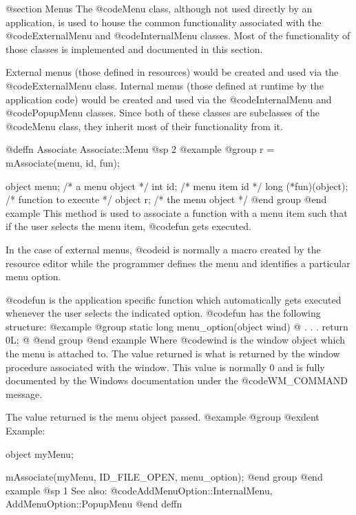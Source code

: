 @section Menus
The @code{Menu} class, although not used directly by an application, is
used to house the common functionality associated with the
@code{ExternalMenu} and @code{InternalMenu} classes.  Most of the
functionality of those classes is implemented and documented in this
section.

External menus (those defined in resources) would be created and used
via the @code{ExternalMenu} class.  Internal menus (those defined at runtime
by the application code) would be created and used via the
@code{InternalMenu} and @code{PopupMenu} classes.  Since both of these
classes are subclasses of the @code{Menu} class, they inherit most of
their functionality from it.







@deffn {Associate} Associate::Menu
@sp 2
@example
@group
r = mAssociate(menu, id, fun);

object  menu;   /*  a menu object     */
int     id;     /*  menu item id      */
long    (*fun)(object);  /*  function to execute  */
object  r;      /*  the menu object   */
@end group
@end example
This method is used to associate a function with a menu item such that if
the user selects the menu item, @code{fun} gets executed.

In the case of external menus, @code{id} is normally a macro created by
the resource editor while the programmer defines the menu and identifies
a particular menu option.

@code{fun} is the application specific function which automatically gets
executed whenever the user selects the indicated option.  @code{fun} has
the following structure:
@example
@group
static  long    menu_option(object wind)
@{
           .
           .
           .
        return 0L;
@}
@end group
@end example
Where @code{wind} is the window object which the menu is attached to.
The value returned is what is returned by the window procedure associated
with the window.  This value is normally 0 and is fully documented by
the Windows documentation under the @code{WM_COMMAND} message.

The value returned is the menu object passed.
@example
@group
@exdent Example:

object  myMenu;

mAssociate(myMenu, ID_FILE_OPEN, menu_option);
@end group
@end example
@sp 1
See also:  @code{AddMenuOption::InternalMenu, AddMenuOption::PopupMenu}
@end deffn








